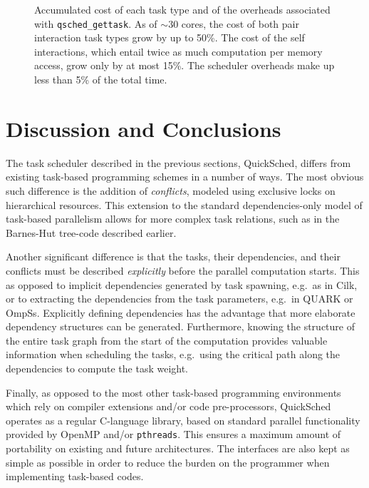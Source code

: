 \documentclass[preprint]{elsarticle}
\begin{document}
\begin{figure}
    \centerline{}
    \caption{Accumulated cost of each task type and of the overheads
        associated with {\tt qsched\_gettask}.
        As of $\sim 30$ cores, the cost of both pair interaction task
        types grow by up to 50\%.
        The cost of the self interactions, which entail twice as much
        computation per memory access, grow only by at most 15\%.
        The scheduler overheads make up less than 5\% of the total
        time.
        }
    \label{fig:BHTimes}
\end{figure}


\section{Discussion and Conclusions}

The task scheduler described in the previous sections, QuickSched,
differs from existing task-based programming schemes
in a number of ways.
The most obvious such difference is the addition of {\em conflicts},
modeled using exclusive locks on hierarchical resources.
This extension to the standard dependencies-only model
of task-based parallelism allows for more complex task relations,
such as in the Barnes-Hut tree-code described earlier.

Another significant difference is that the tasks, their
dependencies, and their conflicts must be described
{\em explicitly} before the parallel computation starts.
This as opposed to implicit dependencies generated
by task spawning, e.g.~as in Cilk, or to extracting the
dependencies from the task parameters, e.g.~in QUARK or OmpSs.
Explicitly defining dependencies has the advantage that 
more elaborate dependency structures can be generated.
Furthermore, knowing the structure of the entire task
graph from the start of the computation provides valuable
information when scheduling the tasks, e.g.~using the 
critical path along the dependencies to compute the
task weight.

Finally, as opposed to the most other task-based
programming environments which rely on compiler extensions
and/or code pre-processors, QuickSched operates as a regular
C-language library, based on standard parallel functionality
provided by OpenMP and/or {\tt pthreads}.
This ensures a maximum amount of portability on existing
and future architectures.
The interfaces are also kept as simple
as possible in order to reduce the burden on the programmer
when implementing task-based codes.
\end{document}
